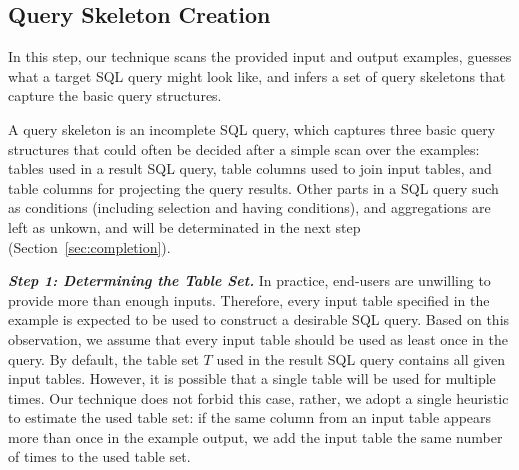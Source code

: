 \subsection{Query Skeleton Creation}
\label{sec:skeleton}

In this step, our technique scans the provided input and output examples, guesses
what a target SQL query might look like, and infers a set of query skeletons
that capture the basic query structures.

A query skeleton is an incomplete SQL query, which
captures three basic query structures that could
often be decided after a simple scan over the examples:
tables used in a result SQL
query, table columns used to join input tables, and table
columns for projecting the query results. Other parts in a SQL query such as conditions
(including selection and having conditions), and aggregations
are left as unkown, and will be determinated in the next step (Section~\ref{sec:completion}).




\vspace{1mm}
\noindent \textit{\textbf{Step 1: Determining the Table Set.}} 
In practice, end-users are unwilling to provide more than enough
inputs. Therefore, every input table specified in the example
is expected to be used to construct a desirable SQL query.
Based on this observation, we assume that every input table
should be used as least once in the query. By default, the
table set $T$ used in the result SQL query contains all given input tables.
However, it is possible that a single table will be used for multiple times.
Our technique does not forbid this case, rather, we adopt a single heuristic
to estimate the used table set: if the same column from an input table appears more than once in the
example output, we add the input table the same number of times to the used table set.



